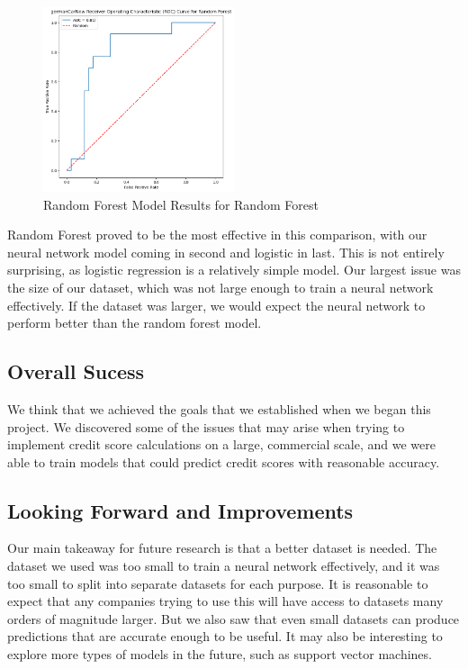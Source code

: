 \documentclass[12pt,twocolumn]{article}
\begin{document}
\begin{figure}
    \centering
    \includegraphics[width=0.5\textwidth]{images/randomforest_newcar.png}
    \caption{Random Forest Model Results for Random Forest}\label{fig:randomforest_newcar_results}
\end{figure}

Random Forest proved to be the most effective in this comparison, with our neural network model coming in second and logistic in last. This is not entirely surprising, as logistic regression is a relatively simple model. Our largest issue was the size of our dataset, which was not large enough to train a neural network effectively. If the dataset was larger, we would expect the neural network to perform better than the random forest model.


\subsection{Overall Sucess}
We think that we achieved the goals that we established when we began this project. We discovered some of the issues that may arise when trying to implement credit score calculations on a large, commercial scale, and we were able to train models that could predict credit scores with reasonable accuracy.

\subsection{Looking Forward and Improvements}
Our main takeaway for future research is that a better dataset is needed. The dataset we used was too small to train a neural network effectively, and it was too small to split into separate datasets for each purpose. It is reasonable to expect that any companies trying to use this will have access to datasets many orders of magnitude larger. But we also saw that even small datasets can produce predictions that are accurate enough to be useful. It may also be interesting to explore more types of models in the future, such as support vector machines.
\end{document}
